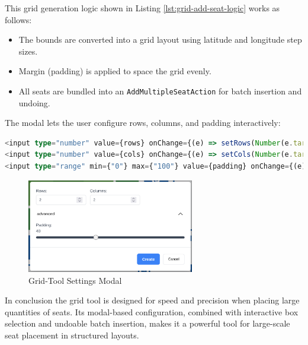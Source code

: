 This grid generation logic shown in Listing \ref{lst:grid-add-seat-logic} works as follows:
\begin{itemize}
    \item The bounds are converted into a grid layout using latitude and longitude step sizes.
    \item Margin (padding) is applied to space the grid evenly.
    \item All seats are bundled into an \texttt{AddMultipleSeatAction} for batch insertion and undoing.
\end{itemize}

The modal lets the user configure rows, columns, and padding interactively:

\begin{lstlisting}[language=TypeScript, caption=Modal Input Fields, label=lst:grid-modal-ui]
<input type="number" value={rows} onChange={(e) => setRows(Number(e.target.value))} />
<input type="number" value={cols} onChange={(e) => setCols(Number(e.target.value))} />
<input type="range" min={"0"} max={"100"} value={padding} onChange={(e) => setPadding(Number(e.target.value))} />
\end{lstlisting}

\begin{figure}[H]
    \centering
    \includegraphics[width=0.65\textwidth]{pics/grid-tool.png}
    \caption{Grid-Tool Settings Modal}
    \label{fig:grid-tool-toolbar}
\end{figure}

In conclusion the grid tool is designed for speed and precision when placing large quantities of seats. Its modal-based configuration, combined with interactive box selection and undoable batch insertion, makes it a powerful tool for large-scale seat placement in structured layouts.
